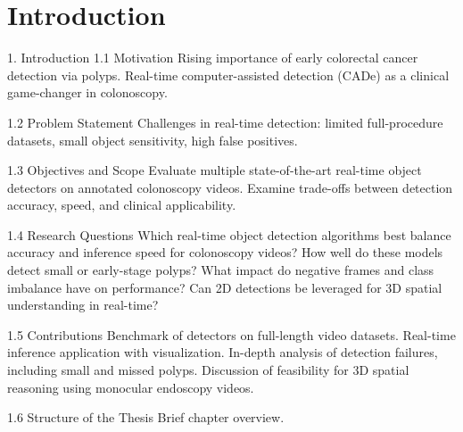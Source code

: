 \section{Introduction}
\label{sec:intro}

1. Introduction
    1.1 Motivation
        Rising importance of early colorectal cancer detection via polyps.
        Real-time computer-assisted detection (CADe) as a clinical game-changer in colonoscopy.

    1.2 Problem Statement
        Challenges in real-time detection: limited full-procedure datasets, small object sensitivity, high false positives.

    1.3 Objectives and Scope
        Evaluate multiple state-of-the-art real-time object detectors on annotated colonoscopy videos.
        Examine trade-offs between detection accuracy, speed, and clinical applicability.

    1.4 Research Questions
        Which real-time object detection algorithms best balance accuracy and inference speed for colonoscopy videos?
        How well do these models detect small or early-stage polyps?
        What impact do negative frames and class imbalance have on performance?
        Can 2D detections be leveraged for 3D spatial understanding in real-time?

    1.5 Contributions
        Benchmark of detectors on full-length video datasets.
        Real-time inference application with visualization.
        In-depth analysis of detection failures, including small and missed polyps.
        Discussion of feasibility for 3D spatial reasoning using monocular endoscopy videos.

    1.6 Structure of the Thesis
        Brief chapter overview.